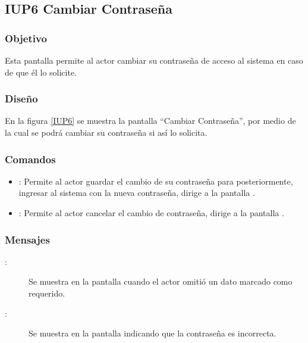 \subsection{IUP6 Cambiar Contraseña}
 
\subsubsection{Objetivo}

    Esta pantalla permite al actor cambiar su contraseña de acceso al sistema en caso de que él lo solicite.

\subsubsection{Diseño}

    En la figura \ref{IUP6} se muestra la pantalla ``Cambiar Contraseña'', por medio de la cual se podrá cambiar su contraseña si así lo solicita. \\


\subsubsection{Comandos}
\begin{itemize}
    \item {}: Permite al actor guardar el cambio de su contraseña para posteriormente, ingresar al sistema con la nueva contraseña, dirige a la pantalla .
    \item {}: Permite al actor cancelar el cambio de contraseña, dirige a la pantalla .
\end{itemize}

\subsubsection{Mensajes}

\begin{description}
    \item[:] Se muestra en la pantalla  cuando el actor omitió un dato marcado como requerido.
    \item[:] Se muestra en la pantalla  indicando que la contraseña es incorrecta.
\end{description}
